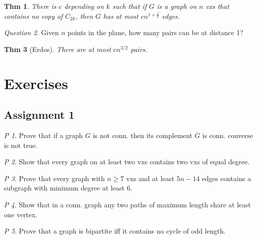 \documentclass[11pt, fleqn, a4paper, landscape]{article}
\theoremstyle{plain} %
\newtheorem{thm}{Thm}
\theoremstyle{remark} %
\newtheorem{que}[thm]{Question}
\newtheorem{problem}{P}
\theoremstyle{definition} %
\begin{document}
\begin{multicols}{5}
\begin{thm}
There is $c$ depending on $k$ such that if $G$ is a graph on $n$ vxs that contains no copy of $C_{2k}$, then $G$ has at most $cn^{1+\frac{1}{k}}$ edges.
\end{thm}

\begin{que}
Given $n$ points in the plane, how many pairs can be at distance 1?
\end{que}

\begin{thm}[Erdos]
There are at most $cn^{3/2}$ pairs.
\end{thm}

\section{Exercises}
\subsection{Assignment 1}


\addtocounter{problem}{1}

\addtocounter{problem}{1}

\begin{problem}
Prove that if a graph $G$ is not conn. then its complement $\overline{G}$ is conn. converse is not true.
\end{problem}

\begin{problem}
Show that every graph on at least two vxs contains two vxs of equal
degree.
\end{problem}

\begin{problem}
Prove that every graph with $n \ge 7$ vxs and at least $5n- 14$ edges contains a subgraph with minimum degree at least 6.
\end{problem}

\begin{problem}
Show that in a conn. graph any two paths of maximum length share at least
one vertex.
\end{problem}

\begin{problem}
Prove that a graph is bipartite iff it contains no cycle of odd length.
\end{problem}


\end{multicols}
\end{document}
